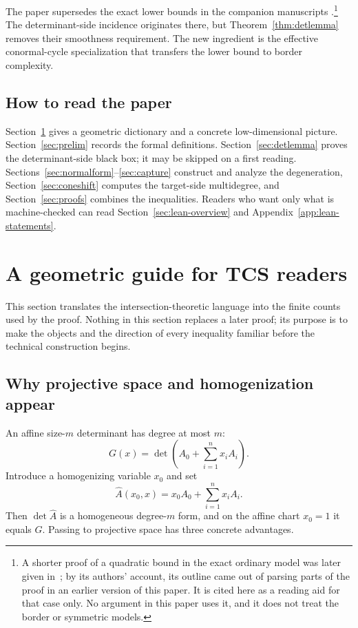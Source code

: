 \documentclass[acmsmall,screen,nonacm]{acmart}
\theoremstyle{definition}
\theoremstyle{remark}
\begin{document}
The paper supersedes the exact lower bounds in the companion manuscripts \cite{SheshadriDC,SheshadriSDC}.\footnote{A shorter proof of a quadratic bound in the exact ordinary model was later given in~\cite{KumarVolk26}; by its authors' account, its outline came out of parsing parts of the proof in an earlier version of this paper.  It is cited here as a reading aid for that case only.  No argument in this paper uses it, and it does not treat the border or symmetric models.}  The determinant-side incidence originates there, but Theorem~\ref{thm:detlemma} removes their smoothness requirement.  The new ingredient is the effective conormal-cycle specialization that transfers the lower bound to border complexity.

\subsection{How to read the paper}

Section~\ref{sec:guide} gives a geometric dictionary and a concrete low-dimensional picture.  Section~\ref{sec:prelim} records the formal definitions.  Section~\ref{sec:detlemma} proves the determinant-side black box; it may be skipped on a first reading.  Sections~\ref{sec:normalform}--\ref{sec:capture} construct and analyze the degeneration, Section~\ref{sec:coneshift} computes the target-side multidegree, and Section~\ref{sec:proofs} combines the inequalities.  Readers who want only what is machine-checked can read Section~\ref{sec:lean-overview} and Appendix~\ref{app:lean-statements}.

\section{A geometric guide for TCS readers}\label{sec:guide}

This section translates the intersection-theoretic language into the finite
counts used by the proof.  Nothing in this section replaces a later proof; its
purpose is to make the objects and the direction of every inequality familiar
before the technical construction begins.

\subsection{Why projective space and homogenization appear}

An affine size-$m$ determinant has degree at most $m$:
\[
  G(x)=\det\!\left(A_0+\sum_{i=1}^n x_iA_i\right).
\]
Introduce a homogenizing variable $x_0$ and set
\[
  \widehat A(x_0,x)=x_0A_0+\sum_{i=1}^n x_iA_i.
\]
Then $\det\widehat A$ is a homogeneous degree-$m$ form, and on the affine
chart $x_0=1$ it equals $G$.  Passing to projective space has three concrete
advantages.
\end{document}
